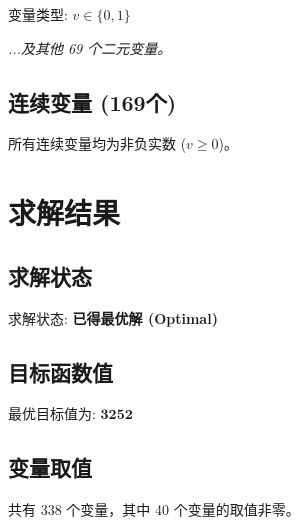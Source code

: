 \documentclass[a4paper,10pt]{article}
\begin{document}
变量类型: $v \in \{0,1\}$

\textit{...及其他 69 个二元变量。}

\subsection{连续变量 (169个)}

所有连续变量均为非负实数 ($v \geq 0$)。

\section{求解结果}

\subsection{求解状态}

求解状态: \textbf{已得最优解 (Optimal)}

\subsection{目标函数值}

最优目标值为: $\mathbf{3252}$

\subsection{变量取值}

共有 338 个变量，其中 40 个变量的取值非零。
\end{document}
